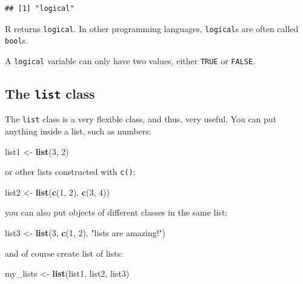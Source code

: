 \documentclass[]{gitbook}
\newenvironment{Shaded}{\begin{snugshade}}{\end{snugshade}}
\newcommand{\DecValTok}[1]{\textcolor[rgb]{0.00,0.00,0.81}{#1}}
\newcommand{\KeywordTok}[1]{\textcolor[rgb]{0.13,0.29,0.53}{\textbf{#1}}}
\newcommand{\NormalTok}[1]{#1}
\newcommand{\StringTok}[1]{\textcolor[rgb]{0.31,0.60,0.02}{#1}}
\theoremstyle{definition}
\theoremstyle{definition}
\theoremstyle{definition}
\theoremstyle{remark}
\begin{document}
\begin{verbatim}
## [1] "logical"
\end{verbatim}

R returns \texttt{logical}. In other programming languages,
\texttt{logical}s are often called \texttt{bool}s.

A \texttt{logical} variable can only have two values, either
\texttt{TRUE} or \texttt{FALSE}.

\hypertarget{the-list-class}{%
\subsection{\texorpdfstring{The \texttt{list}
class}{The list class}}\label{the-list-class}}

The \texttt{list} class is a very flexible class, and thus, very useful.
You can put anything inside a list, such as numbers:

\begin{Shaded}
\begin{Highlighting}[]
\NormalTok{list1 <-}\StringTok{ }\KeywordTok{list}\NormalTok{(}\DecValTok{3}\NormalTok{, }\DecValTok{2}\NormalTok{)}
\end{Highlighting}
\end{Shaded}

or other lists constructed with \texttt{c()}:

\begin{Shaded}
\begin{Highlighting}[]
\NormalTok{list2 <-}\StringTok{ }\KeywordTok{list}\NormalTok{(}\KeywordTok{c}\NormalTok{(}\DecValTok{1}\NormalTok{, }\DecValTok{2}\NormalTok{), }\KeywordTok{c}\NormalTok{(}\DecValTok{3}\NormalTok{, }\DecValTok{4}\NormalTok{))}
\end{Highlighting}
\end{Shaded}

you can also put objects of different classes in the same list:

\begin{Shaded}
\begin{Highlighting}[]
\NormalTok{list3 <-}\StringTok{ }\KeywordTok{list}\NormalTok{(}\DecValTok{3}\NormalTok{, }\KeywordTok{c}\NormalTok{(}\DecValTok{1}\NormalTok{, }\DecValTok{2}\NormalTok{), }\StringTok{"lists are amazing!"}\NormalTok{)}
\end{Highlighting}
\end{Shaded}

and of course create list of lists:

\begin{Shaded}
\begin{Highlighting}[]
\NormalTok{my_lists <-}\StringTok{ }\KeywordTok{list}\NormalTok{(list1, list2, list3)}
\end{Highlighting}
\end{Shaded}
\end{document}
